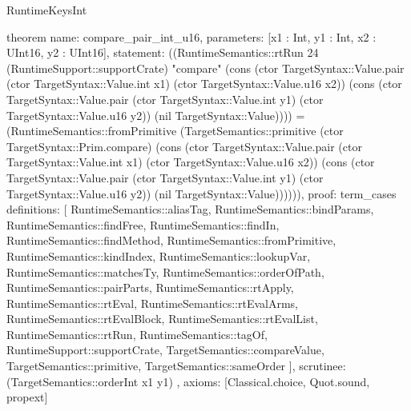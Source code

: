 \begin{lexlean}{RuntimeKeysInt}
\begin{semanticmodule}
theorem{
  name: compare_pair_int_u16,
  parameters: [x1 : Int, y1 : Int, x2 : UInt16, y2 : UInt16],
  statement: ((RuntimeSemantics::rtRun 24 (RuntimeSupport::supportCrate) "compare" (cons (ctor TargetSyntax::Value.pair (ctor TargetSyntax::Value.int x1) (ctor TargetSyntax::Value.u16 x2)) (cons (ctor TargetSyntax::Value.pair (ctor TargetSyntax::Value.int y1) (ctor TargetSyntax::Value.u16 y2)) (nil TargetSyntax::Value)))) = (RuntimeSemantics::fromPrimitive (TargetSemantics::primitive (ctor TargetSyntax::Prim.compare) (cons (ctor TargetSyntax::Value.pair (ctor TargetSyntax::Value.int x1) (ctor TargetSyntax::Value.u16 x2)) (cons (ctor TargetSyntax::Value.pair (ctor TargetSyntax::Value.int y1) (ctor TargetSyntax::Value.u16 y2)) (nil TargetSyntax::Value)))))),
  proof: term_cases{
    definitions: [
      RuntimeSemantics::aliasTag,
      RuntimeSemantics::bindParams,
      RuntimeSemantics::findFree,
      RuntimeSemantics::findIn,
      RuntimeSemantics::findMethod,
      RuntimeSemantics::fromPrimitive,
      RuntimeSemantics::kindIndex,
      RuntimeSemantics::lookupVar,
      RuntimeSemantics::matchesTy,
      RuntimeSemantics::orderOfPath,
      RuntimeSemantics::pairParts,
      RuntimeSemantics::rtApply,
      RuntimeSemantics::rtEval,
      RuntimeSemantics::rtEvalArms,
      RuntimeSemantics::rtEvalBlock,
      RuntimeSemantics::rtEvalList,
      RuntimeSemantics::rtRun,
      RuntimeSemantics::tagOf,
      RuntimeSupport::supportCrate,
      TargetSemantics::compareValue,
      TargetSemantics::primitive,
      TargetSemantics::sameOrder
    ],
    scrutinee: (TargetSemantics::orderInt x1 y1)
  },
  axioms: [Classical.choice, Quot.sound, propext]
}


\end{semanticmodule}
\end{lexlean}
